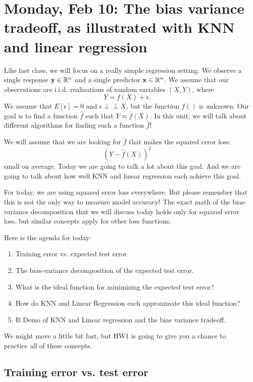 \section{Monday, Feb 10: The bias variance tradeoff, as illustrated with KNN and linear regression}

Like last class, we will focus on a really simple regression setting. We observe a single response $\bold{y} \in \mathbb{R}^n$ and a single predictor $\bold{x} \in \mathbb{R}^n$. We assume that our observations are i.i.d. realizations of random variables $(X,Y)$, where
$$
Y = f(X) + \epsilon.
$$
We assume that $E[\epsilon]=0$ and $\epsilon \perp\!\!\!\perp X$, but the function $f()$ is unknown. Our goal is to find a function $\hat{f}$ such that $Y \approx \hat{f}(X)$. In this unit, we will talk about different algorithms for finding such a function $\hat{f}$!

We will assume that we are looking for $\hat{f}$ that makes the squared error loss:
$$
\left(Y - \hat{f}(X)\right)^2
$$ 
small on average. Today we are going to talk a lot about this goal. And we are going to talk about how well KNN and linear regression each achieve this goal. 

For today, we are using squared error loss everywhere. But please remember that this is not the only way to measure model accuracy! The exact math of the bias-variance decomposition that we will discuss today holds only for squared error loss, but similar concepts apply for other loss functions. 

Here is the agenda for today:
\begin{enumerate}
\item Training error vs. expected test error. 
\item The bias-variance decomposition of the expected test error. 
\item What is the ideal function for minimizing the expected test error?
\item How do KNN and Linear Regression each approximate this ideal function?
\item R Demo of KNN and Linear regression and the bias variance tradeoff. 
\end{enumerate}
We might move a little bit fast, but HW1 is going to give you a chance to practice all of these concepts. 

\subsection{Training error vs. test error}


